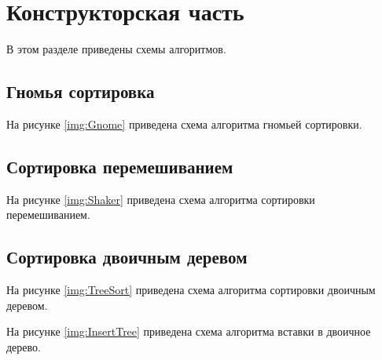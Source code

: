 \chapter{Конструкторская часть}
В этом разделе приведены схемы алгоритмов.

\section{Гномья сортировка}
На рисунке \ref{img:Gnome} приведена схема алгоритма гномьей сортировки.

\clearpage

\section{Сортировка перемешиванием}
На рисунке \ref{img:Shaker} приведена схема алгоритма сортировки перемешиванием.

\clearpage

\section{Сортировка двоичным деревом}
На рисунке \ref{img:TreeSort} приведена схема алгоритма сортировки двоичным деревом.

\clearpage

На рисунке \ref{img:InsertTree} приведена схема алгоритма вставки в двоичное дерево.

\clearpage
